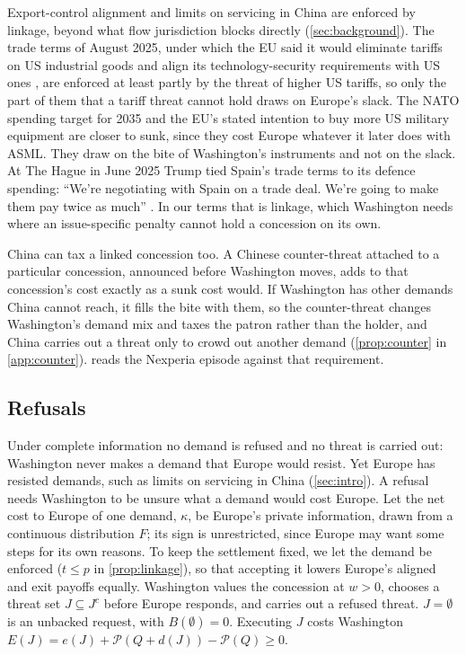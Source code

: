 Export-control alignment and limits on servicing in China are enforced by linkage, beyond what flow jurisdiction blocks directly (\cref{sec:background}). The trade terms of August 2025, under which the EU said it would eliminate tariffs on US industrial goods and align its technology-security requirements with US ones \citep{whitehouse2025jointstatement}, are enforced at least partly by the threat of higher US tariffs, so only the part of them that a tariff threat cannot hold draws on Europe's slack. The NATO spending target for 2035 \citep{nato2025hague} and the EU's stated intention to buy more US military equipment \citep{whitehouse2025jointstatement} are closer to sunk, since they cost Europe whatever it later does with ASML. They draw on the bite of Washington's instruments and not on the slack. At The Hague in June 2025 Trump tied Spain's trade terms to its defence spending: ``We're negotiating with Spain on a trade deal. We're going to make them pay twice as much'' \citep{rte2025nato}. In our terms that is linkage, which Washington needs where an issue-specific penalty cannot hold a concession on its own.

China can tax a linked concession too. A Chinese counter-threat attached to a particular concession, announced before Washington moves, adds to that concession's cost exactly as a sunk cost would. If Washington has other demands China cannot reach, it fills the bite with them, so the counter-threat changes Washington's demand mix and taxes the patron rather than the holder, and China carries out a threat only to crowd out another demand (\cref{prop:counter} in \cref{app:counter}).  reads the Nexperia episode against that requirement.

\subsection{Refusals}\label{sec:refusals}

Under complete information no demand is refused and no threat is carried out: Washington never makes a demand that Europe would resist. Yet Europe has resisted demands, such as limits on servicing in China (\cref{sec:intro}). A refusal needs Washington to be unsure what a demand would cost Europe. Let the net cost to Europe of one demand, $\kappa$, be Europe's private information, drawn from a continuous distribution $F$; its sign is unrestricted, since Europe may want some steps for its own reasons. To keep the settlement fixed, we let the demand be enforced ($t\le p$ in \cref{prop:linkage}), so that accepting it lowers Europe's aligned and exit payoffs equally. Washington values the concession at $w>0$, chooses a threat set $J\subseteq J^c$ before Europe responds, and carries out a refused threat. $J=\emptyset$ is an unbacked request, with $B(\emptyset)=0$. Executing $J$ costs Washington $E(J)=e(J)+\mathcal P(Q+d(J))-\mathcal P(Q)\ge 0$.

